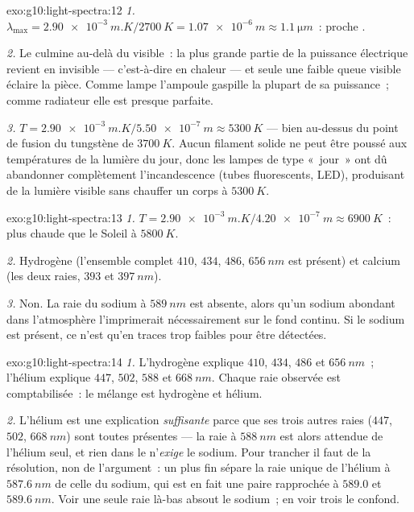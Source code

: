 \begin{solution}{exo:g10:light-spectra:12}
\emph{1.} $\lambda_{\max} = \qty{2.90e-3}{m.K} / \qty{2700}{K}
= \qty{1.07e-6}{m} \approx \qty{1.1}{\micro m}$~: proche
.

\emph{2.} Le  culmine au-delà du visible~: la plus grande partie
de la puissance électrique revient en  invisible ---
c'est-à-dire en chaleur --- et seule une faible queue visible éclaire la
pièce. Comme lampe l'ampoule gaspille la plupart de sa puissance~; comme
radiateur elle est presque parfaite.

\emph{3.} $T = \qty{2.90e-3}{m.K} / \qty{5.50e-7}{m} \approx
\qty{5300}{K}$ --- bien au-dessus du point de fusion du tungstène de
$\qty{3700}{K}$. Aucun filament solide ne peut être poussé aux
températures de la lumière du jour, donc les lampes de type «~jour~»
ont dû abandonner complètement l'incandescence (tubes fluorescents,
LED), produisant de la lumière visible sans chauffer un corps à
$\qty{5300}{K}$.
\end{solution}

\begin{solution}{exo:g10:light-spectra:13}
\emph{1.} $T = \qty{2.90e-3}{m.K} / \qty{4.20e-7}{m} \approx
\qty{6900}{K}$~: plus chaude que le Soleil à $\qty{5800}{K}$.

\emph{2.} Hydrogène (l'ensemble complet $410$, $434$, $486$,
$\qty{656}{nm}$ est présent) et calcium (les deux raies, $393$ et
$\qty{397}{nm}$).

\emph{3.} Non. La raie du sodium à $\qty{589}{nm}$ est absente, alors
qu'un sodium abondant dans l'atmosphère l'imprimerait nécessairement sur
le fond continu. Si le sodium est présent, ce n'est qu'en traces trop
faibles pour être détectées.
\end{solution}

\begin{solution}{exo:g10:light-spectra:14}
\emph{1.} L'hydrogène explique $410$, $434$, $486$ et $\qty{656}{nm}$~;
l'hélium explique $447$, $502$, $588$ et $\qty{668}{nm}$. Chaque raie
observée est comptabilisée~: le mélange est hydrogène et hélium.

\emph{2.} L'hélium est une explication \emph{suffisante} parce que ses
trois autres raies ($447$, $502$, $\qty{668}{nm}$) sont toutes
présentes --- la raie à $\qty{588}{nm}$ est alors attendue de l'hélium
seul, et rien dans le  n'\emph{exige} le sodium. Pour trancher
il faut de la résolution, non de l'argument~: un  plus
fin sépare la raie unique de l'hélium à $\qty{587.6}{nm}$ de celle du
sodium, qui est en fait une paire rapprochée à $589.0$ et
$\qty{589.6}{nm}$. Voir une seule raie là-bas absout le sodium~; en
voir trois le confond.
\end{solution}

